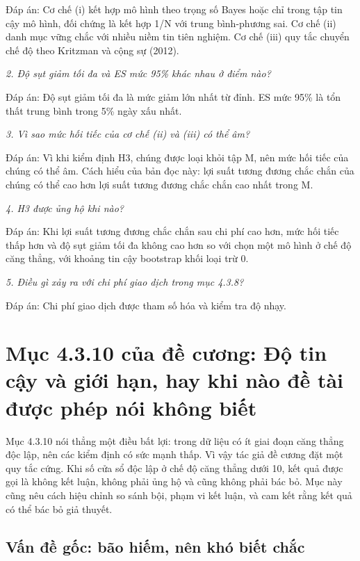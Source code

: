 Đáp án: Cơ chế (i) kết hợp mô hình theo trọng số Bayes hoặc chỉ trong tập tin cậy mô hình, đối chứng là kết hợp 1/N với trung bình-phương sai. Cơ chế (ii) danh mục vững chắc với nhiều niềm tin tiên nghiệm. Cơ chế (iii) quy tắc chuyển chế độ theo Kritzman và cộng sự (2012).

{\itshape 2. Độ sụt giảm tối đa và ES mức 95\% khác nhau ở điểm nào?\par}

Đáp án: Độ sụt giảm tối đa là mức giảm lớn nhất từ đỉnh. ES mức 95\% là tổn thất trung bình trong 5\% ngày xấu nhất.

{\itshape 3. Vì sao mức hối tiếc của cơ chế (ii) và (iii) có thể âm?\par}

Đáp án: Vì khi kiểm định H3, chúng được loại khỏi tập M, nên mức hối tiếc của chúng có thể âm. Cách hiểu của bản đọc này: lợi suất tương đương chắc chắn của chúng có thể cao hơn lợi suất tương đương chắc chắn cao nhất trong M.

{\itshape 4. H3 được ủng hộ khi nào?\par}

Đáp án: Khi lợi suất tương đương chắc chắn sau chi phí cao hơn, mức hối tiếc thấp hơn và độ sụt giảm tối đa không cao hơn so với chọn một mô hình ở chế độ căng thẳng, với khoảng tin cậy bootstrap khối loại trừ 0.

{\itshape 5. Điều gì xảy ra với chi phí giao dịch trong mục 4.3.8?\par}

Đáp án: Chi phí giao dịch được tham số hóa và kiểm tra độ nhạy.

\chapter{Mục 4.3.10 của đề cương: Độ tin cậy và giới hạn, hay khi nào đề tài được phép nói không biết}

Mục 4.3.10 nói thẳng một điều bất lợi: trong dữ liệu có ít giai đoạn căng thẳng độc lập, nên các kiểm định có sức mạnh thấp. Vì vậy tác giả đề cương đặt một quy tắc cứng. Khi số cửa sổ độc lập ở chế độ căng thẳng dưới 10, kết quả được gọi là không kết luận, không phải ủng hộ và cũng không phải bác bỏ. Mục này cũng nêu cách hiệu chỉnh so sánh bội, phạm vi kết luận, và cam kết rằng kết quả có thể bác bỏ giả thuyết.

\section{Vấn đề gốc: bão hiếm, nên khó biết chắc}

